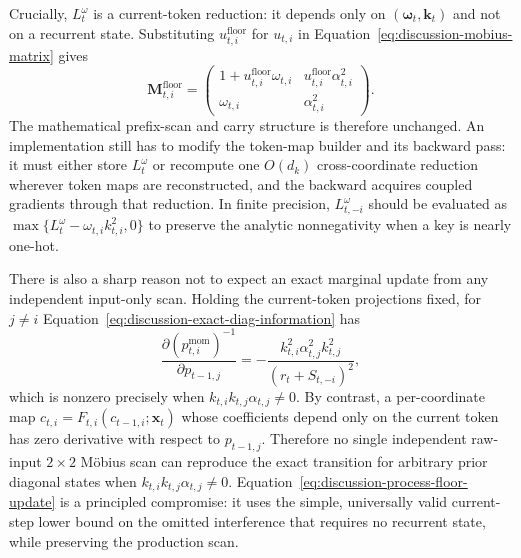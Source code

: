 \documentclass[11pt]{article}
\newcommand{\vct}[1]{\boldsymbol{#1}}
\begin{document}
Crucially, $L_t^{\omega}$ is a current-token reduction: it depends only on
$(\vct{\omega}_t,\vct{k}_t)$ and not on a recurrent state. Substituting
$u_{t,i}^{\mathrm{floor}}$ for $u_{t,i}$ in Equation~\eqref{eq:discussion-mobius-matrix} gives
\begin{equation}
  \vct{M}_{t,i}^{\mathrm{floor}}
  =\begin{pmatrix}
    1+u_{t,i}^{\mathrm{floor}}\omega_{t,i}
      &u_{t,i}^{\mathrm{floor}}\alpha_{t,i}^2\\[2pt]
    \omega_{t,i}&\alpha_{t,i}^2
  \end{pmatrix}.
  \label{eq:discussion-floor-mobius-matrix}
\end{equation}
The mathematical prefix-scan and carry structure is therefore unchanged. An implementation still
has to modify the token-map builder and its backward pass: it must either store $L_t^{\omega}$ or
recompute one $O(d_k)$ cross-coordinate reduction wherever token maps are reconstructed, and the
backward acquires coupled gradients through that reduction. In finite precision,
$L_{t,-i}^{\omega}$ should be evaluated as
$\max\{L_t^{\omega}-\omega_{t,i}k_{t,i}^2,0\}$ to preserve the analytic nonnegativity when a key is
nearly one-hot.

There is also a sharp reason not to expect an exact marginal update from any independent
input-only scan. Holding the current-token projections fixed, for $j\ne i$
Equation~\eqref{eq:discussion-exact-diag-information} has
\begin{equation}
  \frac{\partial (p_{t,i}^{\mathrm{mom}})^{-1}}
    {\partial p_{t-1,j}}
  =-\frac{k_{t,i}^2\alpha_{t,j}^2k_{t,j}^2}
    {(r_t+S_{t,-i})^2},
  \label{eq:discussion-moment-cross-jacobian}
\end{equation}
which is nonzero precisely when $k_{t,i}k_{t,j}\alpha_{t,j}\ne0$. By contrast, a per-coordinate map
$c_{t,i}=F_{t,i}(c_{t-1,i};\vct{x}_t)$ whose coefficients depend only on the current token has
zero derivative with respect to $p_{t-1,j}$. Therefore no single independent raw-input
$2\times2$ M\"obius scan can reproduce the exact transition for arbitrary prior diagonal states
when $k_{t,i}k_{t,j}\alpha_{t,j}\ne0$.
Equation~\eqref{eq:discussion-process-floor-update} is a principled compromise: it uses the
simple, universally valid current-step lower bound on the omitted interference that requires no
recurrent state, while preserving the production scan.
\end{document}
